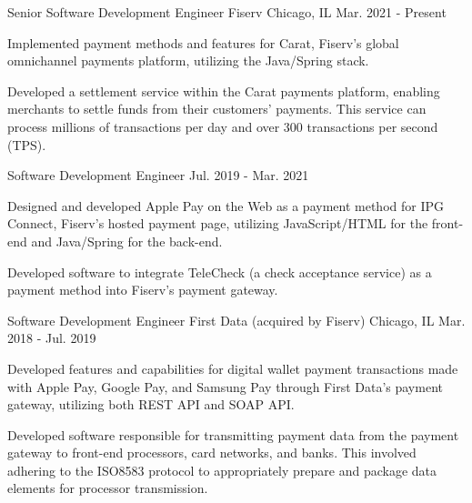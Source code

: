 
\begin{cventries}

    \cventry
    {Senior Software Development Engineer} %
    {Fiserv} %
    {Chicago, IL} %
    {Mar. 2021 - Present} %
    {
        \begin{cvitems} %
            \item {Implemented payment methods and features for Carat, Fiserv’s global omnichannel payments platform, utilizing the Java/Spring stack.}
            \item {Developed a settlement service within the Carat payments platform, enabling merchants to settle funds from their customers' payments. This service can process millions of transactions per day and over 300 transactions per second (TPS).}
        \end{cvitems}
    }
    \cventry
    {Software Development Engineer} %
    {} %
    {} %
    {Jul. 2019 - Mar. 2021} %
    {
        \begin{cvitems} %
            \item {Designed and developed Apple Pay on the Web as a payment method for IPG Connect, Fiserv's hosted payment page, utilizing JavaScript/HTML for the front-end and Java/Spring for the back-end.}
            \item {Developed software to integrate TeleCheck (a check acceptance service) as a payment method into Fiserv's payment gateway.}
        \end{cvitems}
    }


    \cventry
    {Software Development Engineer} %
    {First Data (acquired by Fiserv)} %
    {Chicago, IL} %
    {Mar. 2018 - Jul. 2019} %
    {
        \begin{cvitems} %
            \item {Developed features and capabilities for digital wallet payment transactions made with Apple Pay, Google Pay, and Samsung Pay through First Data's payment gateway, utilizing both REST API and SOAP API.}
            \item {Developed software responsible for transmitting payment data from the payment gateway to front-end processors, card networks, and banks. This involved adhering to the ISO8583 protocol to appropriately prepare and package data elements for processor transmission.}
        \end{cvitems}
    }


\end{cventries}
